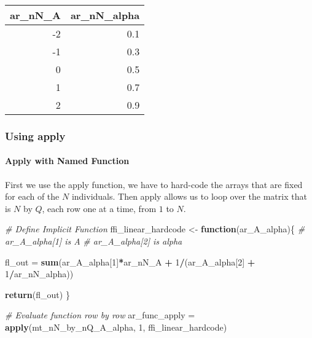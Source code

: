 \documentclass[
]{book}
\newenvironment{Shaded}{\begin{snugshade}}{\end{snugshade}}
\newcommand{\CommentTok}[1]{\textcolor[rgb]{0.56,0.35,0.01}{\textit{#1}}}
\newcommand{\ControlFlowTok}[1]{\textcolor[rgb]{0.13,0.29,0.53}{\textbf{#1}}}
\newcommand{\DecValTok}[1]{\textcolor[rgb]{0.00,0.00,0.81}{#1}}
\newcommand{\KeywordTok}[1]{\textcolor[rgb]{0.13,0.29,0.53}{\textbf{#1}}}
\newcommand{\NormalTok}[1]{#1}
\newcommand{\OperatorTok}[1]{\textcolor[rgb]{0.81,0.36,0.00}{\textbf{#1}}}
\newcommand{\StringTok}[1]{\textcolor[rgb]{0.31,0.60,0.02}{#1}}
\begin{document}
\begin{table}[!h]
\centering
\begin{tabular}{r|r}
\hline
ar\_nN\_A & ar\_nN\_alpha\\
\hline
\rowcolor{gray!6}  -2 & 0.1\\
\hline
-1 & 0.3\\
\hline
\rowcolor{gray!6}  0 & 0.5\\
\hline
1 & 0.7\\
\hline
\rowcolor{gray!6}  2 & 0.9\\
\hline
\end{tabular}
\end{table}

\hypertarget{using-apply}{%
\subsubsection{Using apply}\label{using-apply}}

\hypertarget{apply-with-named-function}{%
\paragraph{Apply with Named Function}\label{apply-with-named-function}}

First we use the apply function, we have to hard-code the arrays that are fixed for each of the \(N\) individuals. Then apply allows us to loop over the matrix that is \(N\) by \(Q\), each row one at a time, from \(1\) to \(N\).

\begin{Shaded}
\begin{Highlighting}[]
\CommentTok{# Define Implicit Function}
\NormalTok{ffi_linear_hardcode <-}\StringTok{ }\ControlFlowTok{function}\NormalTok{(ar_A_alpha)\{}
  \CommentTok{# ar_A_alpha[1] is A}
  \CommentTok{# ar_A_alpha[2] is alpha}

\NormalTok{  fl_out =}\StringTok{ }\KeywordTok{sum}\NormalTok{(ar_A_alpha[}\DecValTok{1}\NormalTok{]}\OperatorTok{*}\NormalTok{ar_nN_A }\OperatorTok{+}\StringTok{ }\DecValTok{1}\OperatorTok{/}\NormalTok{(ar_A_alpha[}\DecValTok{2}\NormalTok{] }\OperatorTok{+}\StringTok{ }\DecValTok{1}\OperatorTok{/}\NormalTok{ar_nN_alpha))}

  \KeywordTok{return}\NormalTok{(fl_out)}
\NormalTok{\}}

\CommentTok{# Evaluate function row by row}
\NormalTok{ar_func_apply =}\StringTok{ }\KeywordTok{apply}\NormalTok{(mt_nN_by_nQ_A_alpha, }\DecValTok{1}\NormalTok{, ffi_linear_hardcode)}
\end{Highlighting}
\end{Shaded}
\end{document}
